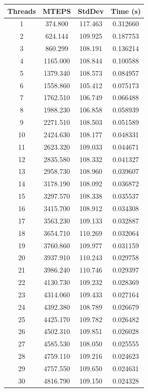\documentclass[10pt,twocolumn,letterpaper]{article}
\begin{document}
\begin{table}[h]
\renewcommand\arraystretch{0.8}
\centering
\begin{tabular}{@{}c|ccc@{}}
\toprule
Threads          & MTEPS  & StdDev     & Time (s)      \\ \midrule
1 & 374.800 & 117.463 & 0.312660 \\
2 & 624.144 & 109.925 & 0.187753 \\
3 & 860.299 & 108.191 & 0.136214 \\
4 & 1165.000 & 108.844 & 0.100588 \\
5 & 1379.340 & 108.573 & 0.084957 \\
6 & 1558.860 & 105.412 & 0.075173 \\
7 & 1762.510 & 106.749 & 0.066488 \\
8 & 1988.230 & 106.858 & 0.058939 \\
9 & 2271.510 & 108.503 & 0.051589 \\
10 & 2424.630 & 108.177 & 0.048331 \\
11 & 2623.320 & 109.033 & 0.044671 \\
12 & 2835.580 & 108.332 & 0.041327 \\
13 & 2958.730 & 108.960 & 0.039607 \\
14 & 3178.190 & 108.092 & 0.036872 \\
15 & 3297.570 & 108.338 & 0.035537 \\
16 & 3415.700 & 108.912 & 0.034308 \\
17 & 3563.230 & 109.133 & 0.032887 \\
18 & 3654.710 & 110.269 & 0.032064 \\
19 & 3760.860 & 109.977 & 0.031159 \\
20 & 3937.910 & 110.243 & 0.029758 \\
21 & 3986.240 & 110.746 & 0.029397 \\
22 & 4130.730 & 109.232 & 0.028369 \\
23 & 4314.060 & 109.433 & 0.027164 \\
24 & 4392.380 & 108.789 & 0.026679 \\
25 & 4425.170 & 109.782 & 0.026482 \\
26 & 4502.310 & 109.851 & 0.026028 \\
27 & 4585.530 & 108.050 & 0.025555 \\
28 & 4759.110 & 109.216 & 0.024623 \\
29 & 4757.550 & 109.650 & 0.024631 \\
30 & 4816.790 & 109.150 & 0.024328 \\

\end{tabular}
\end{table}
\end{document}
